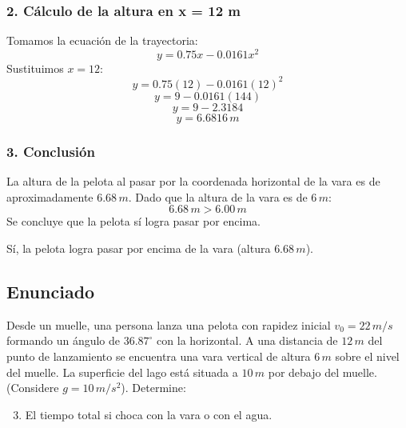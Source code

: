 \documentclass[12pt, a4paper]{article}
\begin{document}
\subsubsection*{2. Cálculo de la altura en x = 12 m}
Tomamos la ecuación de la trayectoria:
$$ y = 0.75 x - 0.0161 x^2 $$
Sustituimos $x = 12$:
$$ y = 0.75(12) - 0.0161(12)^2 $$
$$ y = 9 - 0.0161(144) $$
$$ y = 9 - 2.3184 $$
$$ y = 6.6816 \, \si{m} $$

\subsubsection*{3. Conclusión}
La altura de la pelota al pasar por la coordenada horizontal de la vara es de aproximadamente $6.68 \, \si{m}$. Dado que la altura de la vara es de $6 \, \si{m}$:
$$ 6.68 \, \si{m} > 6.00 \, \si{m} $$
Se concluye que la pelota sí logra pasar por encima.

\begin{tcolorbox}[colback=green!5!white, colframe=green!50!black, title=Respuesta Final]
\centering Sí, la pelota logra pasar por encima de la vara (altura $6.68 \, \si{m}$).
\end{tcolorbox}

\newpage

\subsection*{Enunciado}
Desde un muelle, una persona lanza una pelota con rapidez inicial $v_0 = 22 \, \si{m/s}$ formando un ángulo de $36.87^\circ$ con la horizontal. A una distancia de $12 \, \si{m}$ del punto de lanzamiento se encuentra una vara vertical de altura $6 \, \si{m}$ sobre el nivel del muelle. La superficie del lago está situada a $10 \, \si{m}$ por debajo del muelle. (Considere $g = 10 \, \si{m/s^2}$). Determine:
\begin{enumerate}[label=\alph*)]
    \setcounter{enumi}{2}
    \item El tiempo total si choca con la vara o con el agua.
\end{enumerate}
\end{document}
